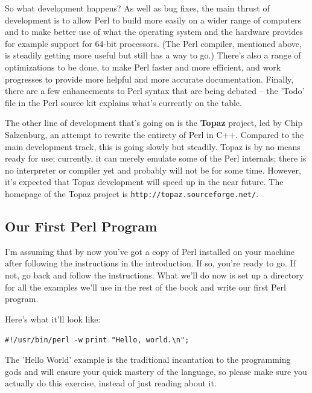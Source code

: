 \documentclass[a4paper,11pt]{book}
\begin{document}
\noindent 

\noindent So what development happens? As well as bug fixes, the main thrust of development is to allow Perl to build more easily on a wider range of computers and to make better use of what the operating system and the hardware provides for example support for 64-bit processors. (The Perl compiler, mentioned above, is steadily getting more useful but still has a way to go.) There's also a range of optimizations to be done, to make Perl faster and more efficient, and work progresses to provide more helpful and more accurate documentation. Finally, there are a few enhancements to Perl syntax that are being debated -- the 'Todo' file in the Perl source kit explains what's currently on the table.

\noindent 

\noindent The other line of development that's going on is the \textbf{Topaz }project, led by Chip Salzenburg, an attempt to rewrite the entirety of Perl in C++. Compared to the main development track, this is going slowly but steadily. Topaz is by no means ready for use; currently, it can merely emulate some of the Perl internals; there is no interpreter or compiler yet and probably will not be for some time. However, it's expected that Topaz development will speed up in the near future. The homepage of the Topaz project is \texttt{http://topaz.sourceforge.net/}.

\subsection{Our First Perl Program}

\noindent I'm assuming that by now you've got a copy of Perl installed on your machine after following the instructions in the introduction. If so, you're ready to go. If not, go back and follow the instructions. What we'll do now is set up a directory for all the examples we'll use in the rest of the book and write our first Perl program.

\noindent 

\noindent Here's what it'll look like:

\noindent 

\noindent \texttt{\#!/usr/bin/perl -w}
\noindent \texttt{print "Hello, world.\textbackslash n";}

\noindent 

\noindent The 'Hello World' example is the traditional incantation to the programming gods and will ensure your quick mastery of the language, so please make sure you actually do this exercise, instead of just reading about it.
\end{document}
